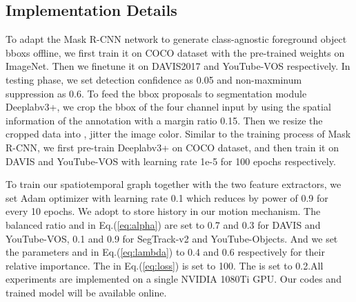 \documentclass[letterpaper]{article} \usepackage{aaai21}  \usepackage{times}  \usepackage{helvet} \usepackage{courier}  \usepackage[hyphens]{url}  \usepackage{graphicx} \urlstyle{rm} \def\UrlFont{\rm}  \usepackage{graphicx}  \usepackage{natbib}  \usepackage{caption} \frenchspacing  \setlength{\pdfpagewidth}{8.5in}  \setlength{\pdfpageheight}{11in}  \usepackage{amsmath}
\begin{document}
\subsection{Implementation Details}
To adapt the Mask R-CNN network to generate class-agnostic foreground object bboxs offline, we first train it on COCO dataset with the pre-trained weights on ImageNet. Then we finetune it on DAVIS2017 and YouTube-VOS respectively. In testing phase, we set detection confidence as 0.05 and non-maxminum suppression as 0.6.
To feed the bbox proposals to segmentation module Deeplabv3+, we crop the bbox of the four channel input by using the spatial information of the annotation with a margin ratio 0.15. Then we resize the cropped data into , jitter the image color. Similar to the training process of Mask R-CNN, we first pre-train Deeplabv3+ on COCO dataset, and then train it on DAVIS and YouTube-VOS with learning rate 1e-5 for 100 epochs respectively.

To train our spatiotemporal graph together with the two feature extractors, we set Adam optimizer with learning rate 0.1 which reduces by power of 0.9 for every 10 epochs. We adopt  to store history in our motion mechanism. The balanced ratio  and  in Eq.(\ref{eq:alpha}) are set to 0.7 and 0.3 for DAVIS and YouTube-VOS, 0.1 and 0.9 for SegTrack-v2 and YouTube-Objects. And we set the parameters  and  in Eq.(\ref{eq:lambda}) to 0.4 and 0.6 respectively for their relative importance. The  in Eq.(\ref{eq:loss}) is set to 100. The  is set to 0.2.All experiments are implemented on a single NVIDIA 1080Ti GPU. Our codes and trained model will be available online.
\end{document}
